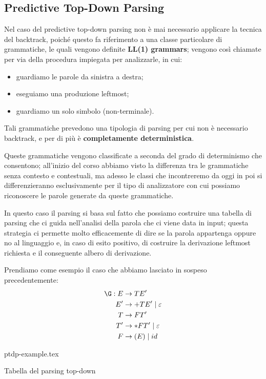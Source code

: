 \documentclass[class=book, crop=false, oneside, 12pt]{standalone}
\begin{document}
\subsection{Predictive Top-Down Parsing}
Nel caso del predictive top-down parsing non è mai necessario applicare la tecnica del backtrack, poiché questo fa riferimento a una classe particolare di grammatiche, le quali vengono definite \textbf{LL(1) grammars}; vengono così chiamate per via della procedura impiegata per analizzarle, in cui:
\begin{itemize}
    \item guardiamo le parole da sinistra a destra;
    \item eseguiamo una produzione leftmost;
    \item guardiamo un solo simbolo (non-terminale).
\end{itemize}
Tali grammatiche prevedono una tipologia di parsing per cui non è necessario backtrack, e per di più è \textbf{completamente deterministica}.

Queste grammatiche vengono classificate a seconda del grado di determinismo che consentono; all'inizio del corso abbiamo visto la differenza tra le grammatiche senza contesto e contestuali, ma adesso le classi che incontreremo da oggi in poi si differenzieranno esclusivamente per il tipo di analizzatore con cui possiamo riconoscere le parole generate da queste grammatiche. 

In questo caso il parsing si basa sul fatto che possiamo costruire una tabella di parsing che ci guida nell'analisi della parola che ci viene data in input; questa strategia ci permette molto efficacemente di dire se la parola appartenga oppure no al linguaggio e, in caso di esito positivo, di costruire la derivazione leftmost richiesta e il conseguente albero di derivazione.

Prendiamo come esempio il caso che abbiamo lasciato in sospeso precedentemente:
\begin{align*}
    \G: E &\rightarrow TE' \\
    E' &\rightarrow +TE' \mid \varepsilon \\
    T &\rightarrow FT' \\
    T' &\rightarrow *FT' \mid \varepsilon \\
    F &\rightarrow (E) \mid id
\end{align*}
\begin{table}[H]
	\centering
	{ptdp-example.tex}
    \caption{Tabella del parsing top-down}
    \label{ptdp-example}
\end{table} 
\end{document}
